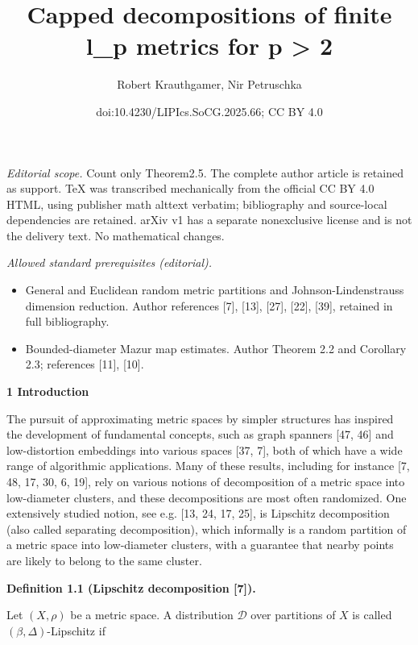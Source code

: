 \documentclass[10pt,a4paper]{amsart}
\title{Capped decompositions of finite l\_p metrics for p > 2}
\author{Robert Krauthgamer, Nir Petruschka}
\date{doi:10.4230/LIPIcs.SoCG.2025.66; CC BY 4.0}
\begin{document}
\maketitle
\noindent\textit{Editorial scope.} Count only Theorem2.5. The complete author article is retained as support. TeX was transcribed mechanically from the official CC BY 4.0 HTML, using publisher math alttext verbatim; bibliography and source-local dependencies are retained. arXiv v1 has a separate nonexclusive license and is not the delivery text. No mathematical changes.\par\medskip
\noindent\textit{Allowed standard prerequisites (editorial).}\begin{itemize}
\item General and Euclidean random metric partitions and Johnson-Lindenstrauss dimension reduction. Author references [7], [13], [27], [22], [39], retained in full bibliography.
\item Bounded-diameter Mazur map estimates. Author Theorem 2.2 and Corollary 2.3; references [11], [10].
\end{itemize}\medskip
\par\medskip\noindent\textbf{1 Introduction}\par
The pursuit of approximating metric spaces by simpler structures has inspired the development of fundamental concepts, such as graph spanners [47, 46] and low-distortion embeddings into various spaces [37, 7], both of which have a wide range of algorithmic applications. Many of these results, including for instance [7, 48, 17, 30, 6, 19], rely on various notions of decomposition of a metric space into low-diameter clusters, and these decompositions are most often randomized. One extensively studied notion, see e.g. [13, 24, 17, 25], is Lipschitz decomposition (also called separating decomposition), which informally is a random partition of a metric space into low-diameter clusters, with a guarantee that nearby points are likely to belong to the same cluster.
\par
\par
\par\medskip\noindent\textbf{Definition 1.1 (Lipschitz decomposition [7]).}\par
Let $(X,\rho)$ be a metric space. A distribution $\mathcal{D}$ over partitions of $X$ is called $(\beta,\Delta)$-Lipschitz if
\par
\end{document}
